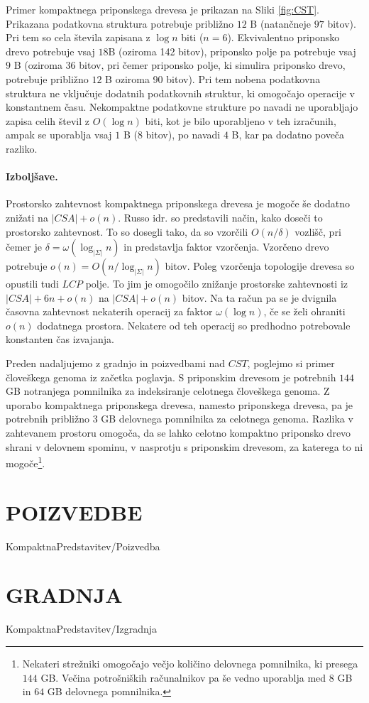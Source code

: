 Primer kompaktnega priponskega drevesa je prikazan na Sliki \ref{fig:CST}. Prikazana podatkovna struktura potrebuje približno $12$ B (natančneje $97$ bitov). Pri tem so cela števila zapisana z $\log{n}$ biti ($n=6$). Ekvivalentno priponsko drevo potrebuje vsaj $18$B (oziroma 142 bitov), priponsko polje pa potrebuje vsaj $9$ B (oziroma 36 bitov, pri čemer priponsko polje, ki simulira priponsko drevo, potrebuje približno $12$ B oziroma 90 bitov). Pri tem nobena podatkovna struktura ne vključuje dodatnih podatkovnih struktur, ki omogočajo operacije v konstantnem času. Nekompaktne podatkovne strukture po navadi ne uporabljajo zapisa celih števil z $O(\log{n})$ biti, kot je bilo uporabljeno v teh izračunih, ampak se uporablja vsaj $1$ B (8 bitov), po navadi $4$ B, kar pa dodatno poveča razliko.

\paragraph{Izboljšave.}
Prostorsko zahtevnost kompaktnega priponskega drevesa je mogoče še dodatno znižati na $|CSA|+o(n)$. Russo idr. \cite{Russo2008} so predstavili način, kako doseči to prostorsko zahtevnost. To so dosegli tako, da so vzorčili $O(n/\delta)$ vozlišč, pri čemer je $\delta=\omega(\log_{|\Sigma|}{n})$ in predstavlja faktor vzorčenja. Vzorčeno drevo potrebuje $o(n)=O(n/\log_{|\Sigma|}{n})$ bitov. Poleg vzorčenja topologije drevesa so opustili tudi $LCP$ polje. To jim je omogočilo znižanje prostorske zahtevnosti iz $|CSA|+6n+o(n)$ na $|CSA|+o(n)$ bitov. Na ta račun pa se je dvignila časovna zahtevnost nekaterih operacij za faktor $\omega(\log{n})$, če se želi ohraniti $o(n)$ dodatnega prostora. Nekatere od teh operacij so predhodno potrebovale konstanten čas izvajanja.

Preden nadaljujemo z gradnjo in poizvedbami nad $CST$, poglejmo si primer človeškega genoma iz začetka poglavja. S priponskim drevesom je potrebnih $144$ GB notranjega pomnilnika za indeksiranje celotnega človeškega genoma. Z uporabo kompaktnega priponskega drevesa, namesto priponskega drevesa, pa je potrebnih približno $3$ GB delovnega pomnilnika za celotnega genoma. Razlika v zahtevanem prostoru omogoča, da se lahko celotno kompaktno priponsko drevo shrani v delovnem spominu, v nasprotju s priponskim drevesom, za katerega to ni mogoče\footnote{Nekateri strežniki omogočajo večjo količino delovnega pomnilnika, ki presega $144$ GB. Večina potrošniških računalnikov pa še vedno uporablja med $8$ GB in $64$ GB delovnega pomnilnika.}.

\section{POIZVEDBE}\label{sec:CSTpoizvedba}
{KompaktnaPredstavitev/Poizvedba}

\section{GRADNJA}\label{sec:CSTizgradnja}
{KompaktnaPredstavitev/Izgradnja}





